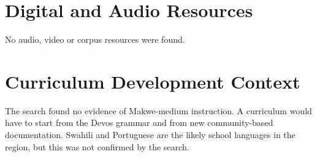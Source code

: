 \documentclass[12pt]{article}
\begin{document}
\section{Digital and Audio Resources}
No audio, video or corpus resources were found.

\section{Curriculum Development Context}
The search found no evidence of Makwe-medium instruction. A curriculum would have to start from the Devos grammar and from new community-based documentation. Swahili and Portuguese are the likely school languages in the region, but this was not confirmed by the search.
\end{document}
